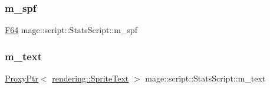\subsubsection{\texorpdfstring{m\+\_\+spf}{m\_spf}}
{\footnotesize\ttfamily \mbox{\hyperlink{namespacemage_ad26233bbec640deda836e572c1a23708}{F64}} mage\+::script\+::\+Stats\+Script\+::m\+\_\+spf\hspace{0.3cm}{\ttfamily [private]}}

\mbox{\label{classmage_1_1script_1_1_stats_script_a1fe11e7a3622fa5e3585fb6786e2d2e7}} 
\subsubsection{\texorpdfstring{m\+\_\+text}{m\_text}}
{\footnotesize\ttfamily \mbox{\hyperlink{classmage_1_1_proxy_ptr}{Proxy\+Ptr}}$<$ \mbox{\hyperlink{classmage_1_1rendering_1_1_sprite_text}{rendering\+::\+Sprite\+Text}} $>$ mage\+::script\+::\+Stats\+Script\+::m\+\_\+text\hspace{0.3cm}{\ttfamily [private]}}

